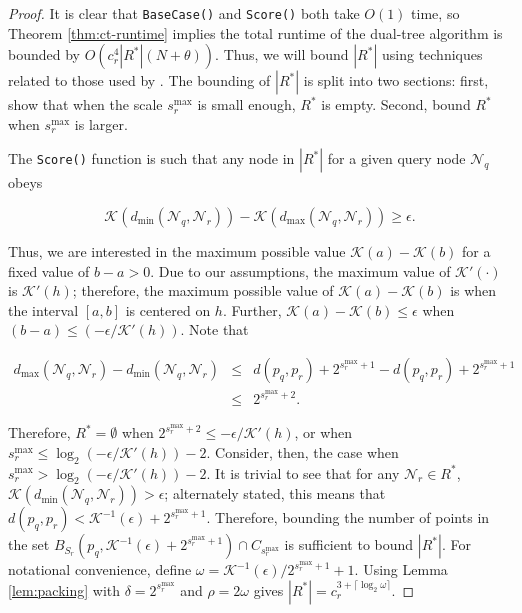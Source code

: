 \begin{proof}
It is clear that \texttt{BaseCase()} and \texttt{Score()} both take $O(1)$ time,
so Theorem \ref{thm:ct-runtime} implies the total runtime of the dual-tree
algorithm is bounded by $O(c_r^4 |R^*| (N + \theta))$.  Thus, we will bound
$|R^*|$ using techniques related to those used by \citet{ram2009}.  The bounding
of $|R^*|$ is split into two sections: first, show that when the scale
$s_r^{\max}$ is small enough, $R^*$ is empty.  Second, bound $R^*$ when
$s_r^{\max}$ is larger.

The \texttt{Score()} function is such that any node in $|R^*|$ for a given query
node $\mathscr{N}_q$ obeys

\begin{equation}
\mathcal{K}(d_{\min}(\mathscr{N}_q, \mathscr{N}_r)) -
\mathcal{K}(d_{\max}(\mathscr{N}_q, \mathscr{N}_r))
\ge \epsilon.
\end{equation}

Thus, we are interested in the maximum possible value $\mathcal{K}(a) -
\mathcal{K}(b)$ for a fixed value of $b - a > 0$.  Due to our assumptions, the
maximum value of $\mathcal{K}'(\cdot)$ is
$\mathcal{K}'(h)$; therefore, the maximum possible value of $\mathcal{K}(a) -
\mathcal{K}(b)$ is when the interval $[a, b]$ is centered on $h$.  Further,
$\mathcal{K}(a) - \mathcal{K}(b) \le \epsilon$ when $(b - a) \le (-\epsilon /
\mathcal{K}'(h))$.  Note that

\begin{eqnarray}
d_{\max}(\mathscr{N}_q, \mathscr{N}_r) - d_{\min}(\mathscr{N}_q, \mathscr{N}_r)
&\le& d(p_q, p_r) + 2^{s_r^{\max} + 1} - d(p_q, p_r) + 2^{s_r^{\max} + 1} \\
 &\le& 2^{s_r^{\max} + 2}.
\end{eqnarray}

Therefore, $R^* = \emptyset$ when
$2^{s_r^{\max} + 2} \le -\epsilon / \mathcal{K}'(h)$, or when
$s_r^{\max} \le \log_2( -\epsilon / \mathcal{K}'(h) ) - 2$.
%
Consider, then, the case when $s_r^{\max} > \log_2( -\epsilon /
\mathcal{K}'(h) ) - 2$.  It is trivial to see that for any $\mathscr{N}_r \in
R^*$, $\mathcal{K}(d_{\min}(\mathscr{N}_q, \mathscr{N}_r)) > \epsilon$;
alternately stated, this means that
$d(p_q, p_r) < \mathcal{K}^{-1}(\epsilon) + 2^{s_r^{\max} + 1}$.
Therefore, bounding the number of points in the set
$B_{S_r}(p_q, \mathcal{K}^{-1}(\epsilon) + 2^{s_r^{\max} + 1}) \cap
C_{s_r^{\max}}$
is sufficient to bound $|R^*|$.  For notational convenience, define $\omega = \mathcal{K}^{-1}(\epsilon) /
2^{s_r^{\max} + 1} + 1$.  Using Lemma \ref{lem:packing} with $\delta =
2^{s_r^{\max}}$ and $\rho = 2 \omega$ gives $|R^*| = c_r^{3 + \lceil \log_2
\omega \rceil}$.


\end{proof}
